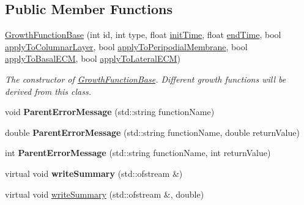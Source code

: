 \subsection*{Public Member Functions}
\begin{DoxyCompactItemize}
\item 
\hyperlink{classGrowthFunctionBase_a5c275b3f839cc4f572b68afc5ad1064f}{Growth\+Function\+Base} (int id, int type, float \hyperlink{classGrowthFunctionBase_ae92513a7b41637df8e26e7db35ddf97c}{init\+Time}, float \hyperlink{classGrowthFunctionBase_a3ff4db0573d354a75666a5f3ca446941}{end\+Time}, bool \hyperlink{classGrowthFunctionBase_a3d56771e7c145589a14e11cc331e0326}{apply\+To\+Columnar\+Layer}, bool \hyperlink{classGrowthFunctionBase_a08ae19f58cb98fa8e315a77f52749732}{apply\+To\+Peripodial\+Membrane}, bool \hyperlink{classGrowthFunctionBase_a9fe46fc6dde4041b79204beb48972a09}{apply\+To\+Basal\+E\+C\+M}, bool \hyperlink{classGrowthFunctionBase_ac623b1dbe376bce5dddbe1a2e21c776f}{apply\+To\+Lateral\+E\+C\+M})
\begin{DoxyCompactList}\small\item\em The constructor of \hyperlink{classGrowthFunctionBase}{Growth\+Function\+Base}. Different growth functions will be derived from this class. \end{DoxyCompactList}\item 
\hypertarget{classGrowthFunctionBase_ac34466fed09a13c5ff21c134934af535}{}void {\bfseries Parent\+Error\+Message} (std\+::string function\+Name)\label{classGrowthFunctionBase_ac34466fed09a13c5ff21c134934af535}

\item 
\hypertarget{classGrowthFunctionBase_ab65e8f6b8eed23d60d8aaef3fa0bed77}{}double {\bfseries Parent\+Error\+Message} (std\+::string function\+Name, double return\+Value)\label{classGrowthFunctionBase_ab65e8f6b8eed23d60d8aaef3fa0bed77}

\item 
\hypertarget{classGrowthFunctionBase_a4e973d83f1232ac057425e924d00ff14}{}int {\bfseries Parent\+Error\+Message} (std\+::string function\+Name, int return\+Value)\label{classGrowthFunctionBase_a4e973d83f1232ac057425e924d00ff14}

\item 
\hypertarget{classGrowthFunctionBase_aba41ce643f8cb19d8ef5b3b55b2f9997}{}virtual void {\bfseries write\+Summary} (std\+::ofstream \&)\label{classGrowthFunctionBase_aba41ce643f8cb19d8ef5b3b55b2f9997}

\item 
\hypertarget{classGrowthFunctionBase_ad6403a702f3ed53984083904755a832b}{}virtual void \hyperlink{classGrowthFunctionBase_ad6403a702f3ed53984083904755a832b}{write\+Summary} (std\+::ofstream \&, double)\label{classGrowthFunctionBase_ad6403a702f3ed53984083904755a832b}


\end{DoxyCompactItemize}
